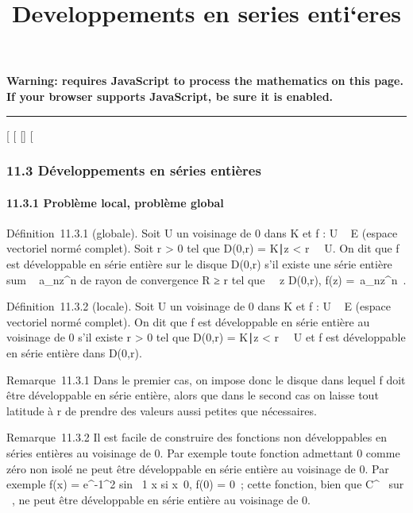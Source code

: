\documentclass[]{article}
\title{Developpements en series enti`eres}
\author{}
\date{}
\begin{document}
\maketitle

\textbf{Warning: 
requires JavaScript to process the mathematics on this page.\\ If your
browser supports JavaScript, be sure it is enabled.}

\begin{center}\rule{3in}{0.4pt}\end{center}

{[}
{[}
{[}{]}
{[}

\subsubsection{11.3 Développements en séries entières}

\paragraph{11.3.1 Problème local, problème global}

Définition~11.3.1 (globale). Soit U un voisinage de 0 dans K et f : U \rightarrow~
E (espace vectoriel normé complet). Soit r \textgreater{} 0 tel que
D(0,r) = \z \in
K∣\textbar{}z\textbar{} \textless{}
r\ \subset~ U. On dit que f est développable en série entière
sur le disque D(0,r) s'il existe une série entière
\\sum ~
a\_nz^n de rayon de convergence R ≥ r tel que
\forall~~z \in D(0,r), f(z) =\
\sum  a\_nz^n~.

Définition~11.3.2 (locale). Soit U un voisinage de 0 dans K et f : U \rightarrow~ E
(espace vectoriel normé complet). On dit que f est développable en série
entière au voisinage de 0 s'il existe r \textgreater{} 0 tel que D(0,r)
= \z \in
K∣\textbar{}z\textbar{} \textless{}
r\ \subset~ U et f est développable en série entière dans
D(0,r).

Remarque~11.3.1 Dans le premier cas, on impose donc le disque dans
lequel f doit être développable en série entière, alors que dans le
second cas on laisse tout latitude à r de prendre des valeurs aussi
petites que nécessaires.

Remarque~11.3.2 Il est facile de construire des fonctions non
développables en séries entières au voisinage de 0. Par exemple toute
fonction admettant 0 comme zéro non isolé ne peut être développable en
série entière au voisinage de 0. Par exemple f(x) =
e^-1\diagupx^2  sin~  1
\over x si x\neq~0, f(0) = 0~;
cette fonction, bien que C^\infty~ sur ~, ne peut être développable
en série entière au voisinage de 0.
\end{document}
